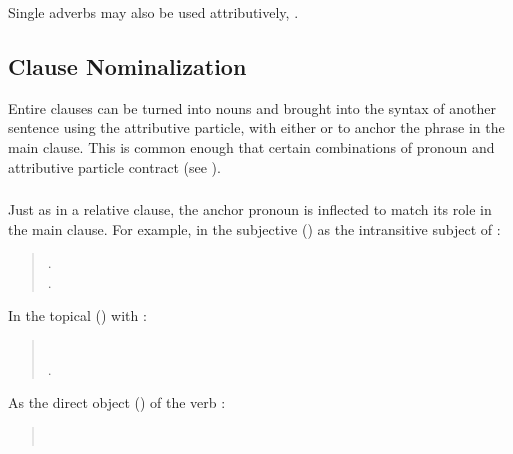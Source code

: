 {\subsubsection{} Single adverbs may also be used attributively,
 .


\subsection{Clause Nominalization} Entire clauses can be turned into
nouns and brought into the syntax of another sentence using the
attributive particle, with either  or  to anchor the
phrase in the main clause.  This is common enough that certain
combinations of pronoun and attributive particle contract (see
). \label{syn:clause-nom}

\subsubsection{} Just as in a relative clause, the anchor pronoun is
inflected to match its role in the main clause.  For example, in the
subjective () as the intransitive subject of :

\begin{quotation}
\noindent{}.\\
\indent{}.
\end{quotation}

\noindent In the topical () with :
\begin{quotation}
\noindent{}\\
\indent{}.
\end{quotation}

\noindent As the direct object () of the verb :
\begin{quotation}
\noindent{}\\
\indent{}
\end{quotation}

}
